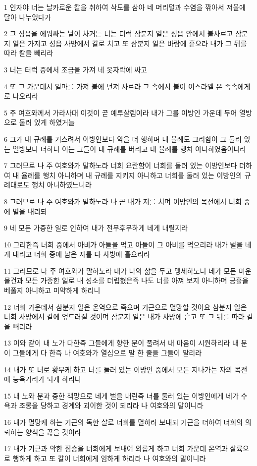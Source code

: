 \par 1 인자야 너는 날카로운 칼을 취하여 삭도를 삼아 네 머리털과 수염을 깎아서 저울에 달아 나누었다가
\par 2 그 성읍을 에워싸는 날이 차거든 너는 터럭 삼분지 일은 성읍 안에서 불사르고 삼분지 일은 가지고 성읍 사방에서 칼로 치고 또 삼분지 일은 바람에 흩으라 내가 그 뒤를 따라 칼을 빼리라
\par 3 너는 터럭 중에서 조금을 가져 네 옷자락에 싸고
\par 4 또 그 가운데서 얼마를 가져 불에 던져 사르라 그 속에서 불이 이스라엘 온 족속에게로 나오리라
\par 5 주 여호와께서 가라사대 이것이 곧 예루살렘이라 내가 그를 이방인 가운데 두어 열방으로 둘러 있게 하였거늘
\par 6 그가 내 규례를 거스려서 이방인보다 악을 더 행하며 내 율례도 그리함이 그 둘러 있는 열방보다 더하니 이는 그들이 내 규례를 버리고 내 율례를 행치 아니하였음이니라
\par 7 그러므로 나 주 여호와가 말하노라 너희 요란함이 너희를 둘러 있는 이방인보다 더하여 내 율례를 행치 아니하며 내 규례를 지키지 아니하고 너희를 둘러 있는 이방인의 규례대로도 행치 아니하였느니라
\par 8 그러므로 나 주 여호와가 말하노라 나 곧 내가 저를 치며 이방인의 목전에서 너희 중에 벌을 내리되
\par 9 네 모든 가증한 일로 인하여 내가 전무후무하게 네게 내릴지라
\par 10 그리한즉 너희 중에서 아비가 아들을 먹고 아들이 그 아비를 먹으리라 내가 벌을 네게 내리고 너희 중에 남은 자를 다 사방에 흩으리라
\par 11 그러므로 나 주 여호와가 말하노라 내가 나의 삶을 두고 맹세하노니 네가 모든 미운 물건과 모든 가증한 일로 내 성소를 더럽혔은즉 나도 너를 아껴 보지 아니하며 긍휼을 베풀지 아니하고 미약하게 하리니
\par 12 너희 가운데서 삼분지 일은 온역으로 죽으며 기근으로 멸망할 것이요 삼분지 일은 너희 사방에서 칼에 엎드러질 것이며 삼분지 일은 내가 사방에 흩고 또 그 뒤를 따라 칼을 빼리라
\par 13 이와 같이 내 노가 다한즉 그들에게 향한 분이 풀려서 내 마음이 시원하리라 내 분이 그들에게 다 한즉 나 여호와가 열심으로 말 한 줄을 그들이 알리라
\par 14 내가 또 너로 황무케 하고 너를 둘러 있는 이방인 중에서 모든 지나가는 자의 목전에 능욕거리가 되게 하리니
\par 15 내 노와 분과 중한 책망으로 네게 벌을 내린즉 너를 둘러 있는 이방인에게 네가 수욕과 조롱을 당하고 경계와 괴이한 것이 되리라 나 여호와의 말이니라
\par 16 내가 멸망케 하는 기근의 독한 살로 너희를 멸하러 보내되 기근을 더하여 너희의 의뢰하는 양식을 끊을 것이라
\par 17 내가 기근과 악한 짐승을 너희에게 보내어 외롭게 하고 너희 가운데 온역과 살륙으로 행하게 하고 또 칼이 너희에게 임하게 하리라 나 여호와의 말이니라

